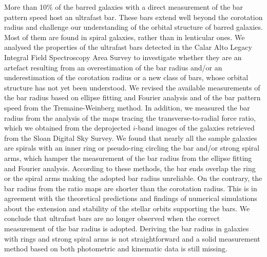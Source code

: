 \documentclass{aa}
\begin{document}
  \abstract
   {More than 10\% of the barred galaxies with a direct measurement of the bar pattern speed host an ultrafast bar. These bars extend well beyond the corotation radius and challenge our understanding of the orbital structure of barred galaxies. Most of them are found in spiral galaxies, rather than in lenticular ones.}
   {We analysed the properties of the ultrafast bars detected in the Calar Alto Legacy Integral Field Spectroscopy Area Survey to investigate whether they are an artefact resulting from an overestimation of the bar radius and/or an underestimation of the corotation radius or a new class of bars, whose orbital structure has not yet been understood.}
   {We revised the available measurements of the bar radius based on ellipse fitting and Fourier analysis and of the bar pattern speed from the Tremaine-Weinberg method. In addition, we measured the bar radius from the analysis of the maps tracing the transverse-to-radial force ratio, which we obtained from the deprojected $i$-band images of the galaxies retrieved from the Sloan Digital Sky Survey.}
   {We found that nearly all the sample galaxies are spirals with an inner ring or pseudo-ring circling the bar and/or strong spiral arms, which hamper the measurement of the bar radius from the ellipse fitting and Fourier analysis. According to these methods, the bar ends overlap the ring or the spiral arms making the adopted bar radius unreliable. On the contrary, the bar radius from the ratio maps are shorter than the corotation radius. This is in agreement with the theoretical predictions and findings of numerical simulations about the extension and stability of the stellar orbits supporting the bars.}
   {We conclude that ultrafast bars are no longer observed when the correct measurement of the bar radius is adopted. Deriving the bar radius in galaxies with rings and strong spiral arms is not straightforward and a solid measurement method based on both photometric and kinematic data is still missing.}



   \maketitle
%
\end{document}

